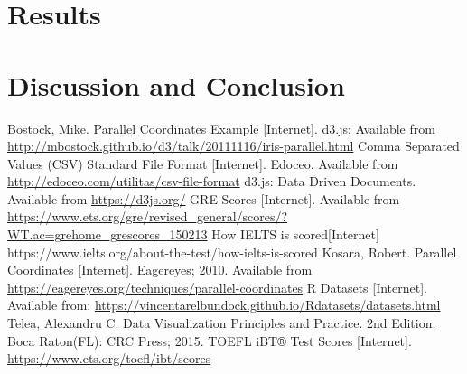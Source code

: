 \documentclass[]{article}
\begin{document}
\section{Results}

\section{Discussion and Conclusion}

\begin{thebibliography}{11}
		Bostock, Mike. Parallel Coordinates Example [Internet]. d3.js; Available from \url{http://mbostock.github.io/d3/talk/20111116/iris-parallel.html}
		Comma Separated Values (CSV) Standard File Format [Internet]. Edoceo. Available from \url{http://edoceo.com/utilitas/csv-file-format}
		d3.js: Data Driven Documents. Available from \url{https://d3js.org/}
		GRE Scores [Internet]. Available from \url{https://www.ets.org/gre/revised_general/scores/?WT.ac=grehome_grescores_150213}
		How IELTS is scored[Internet] https://www.ielts.org/about-the-test/how-ielts-is-scored
		Kosara, Robert. Parallel Coordinates [Internet]. Eagereyes; 2010. Available from \url{https://eagereyes.org/techniques/parallel-coordinates}
		R Datasets [Internet]. Available from: \url{https://vincentarelbundock.github.io/Rdatasets/datasets.html}
		Telea, Alexandru C. Data Visualization Principles and Practice. 2nd Edition. Boca Raton(FL): CRC Press; 2015.
		TOEFL iBT® Test Scores [Internet]. \url{https://www.ets.org/toefl/ibt/scores}
\end{thebibliography}
\end{document}

